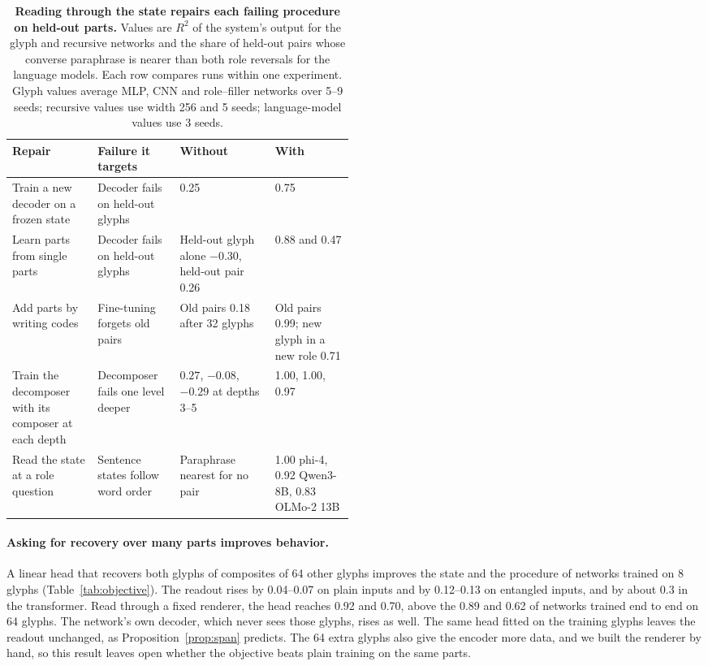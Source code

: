 \documentclass[10pt]{article}
\theoremstyle{plain}
\theoremstyle{remark}
\begin{document}
\begin{table}[t]
  \caption{\textbf{Reading through the state repairs each failing procedure on held-out parts.} Values are $R^2$ of the system's output for the glyph and recursive networks and the share of held-out pairs whose converse paraphrase is nearer than both role reversals for the language models. Each row compares runs within one experiment. Glyph values average MLP, CNN and role--filler networks over 5--9 seeds; recursive values use width 256 and 5 seeds; language-model values use 3 seeds.}
  \label{tab:remedies}
  \centering\small
  \begin{tabularx}{\linewidth}{@{}P{0.25\linewidth}P{0.24\linewidth}YY@{}}
    \toprule
    Repair & Failure it targets & Without & With \\
    \midrule
    Train a new decoder on a frozen state & Decoder fails on held-out glyphs & 0.25 & 0.75 \\
    Learn parts from single parts & Decoder fails on held-out glyphs & Held-out glyph alone $-0.30$, held-out pair 0.26 & 0.88 and 0.47 \\
    Add parts by writing codes & Fine-tuning forgets old pairs & Old pairs 0.18 after 32 glyphs & Old pairs 0.99; new glyph in a new role 0.71 \\
    Train the decomposer with its composer at each depth & Decomposer fails one level deeper & $0.27$, $-0.08$, $-0.29$ at depths 3--5 & 1.00, 1.00, 0.97 \\
    Read the state at a role question & Sentence states follow word order & Paraphrase nearest for no pair & 1.00 phi-4, 0.92 Qwen3-8B, 0.83 OLMo-2 13B \\
    \bottomrule
  \end{tabularx}
\end{table}

\paragraph{Asking for recovery over many parts improves behavior.} A linear head that recovers both glyphs of composites of 64 other glyphs improves the state and the procedure of networks trained on 8 glyphs (Table~\ref{tab:objective}). The readout rises by 0.04--0.07 on plain inputs and by 0.12--0.13 on entangled inputs, and by about 0.3 in the transformer. Read through a fixed renderer, the head reaches 0.92 and 0.70, above the 0.89 and 0.62 of networks trained end to end on 64 glyphs. The network's own decoder, which never sees those glyphs, rises as well. The same head fitted on the training glyphs leaves the readout unchanged, as Proposition~\ref{prop:span} predicts. The 64 extra glyphs also give the encoder more data, and we built the renderer by hand, so this result leaves open whether the objective beats plain training on the same parts.
\end{document}
